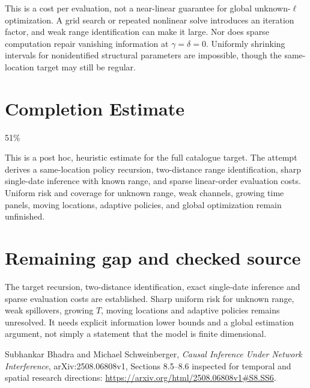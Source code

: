 \documentclass[11pt]{article}
\begin{document}
This is a cost per evaluation, not a near-linear guarantee for global unknown-$\ell$ optimization. A grid search or repeated nonlinear solve introduces an iteration factor, and weak range identification can make it large. Nor does sparse computation repair vanishing information at $\gamma=\delta=0$. Uniformly shrinking intervals for nonidentified structural parameters are impossible, though the same-location target may still be regular.

\section{Completion Estimate}
51\%

This is a post hoc, heuristic estimate for the full catalogue target.
The attempt derives a same-location policy recursion, two-distance range identification, sharp single-date inference with known range, and sparse linear-order evaluation costs. Uniform risk and coverage for unknown range, weak channels, growing time panels, moving locations, adaptive policies, and global optimization remain unfinished.

\section{Remaining gap and checked source}
The target recursion, two-distance identification, exact single-date inference and sparse evaluation costs are established. Sharp uniform risk for unknown range, weak spillovers, growing $T$, moving locations and adaptive policies remains unresolved. It needs explicit information lower bounds and a global estimation argument, not simply a statement that the model is finite dimensional.

Subhankar Bhadra and Michael Schweinberger, \emph{Causal Inference Under Network Interference}, arXiv:2508.06808v1, Sections 8.5--8.6 inspected for temporal and spatial research directions:
\url{https://arxiv.org/html/2508.06808v1#S8.SS6}.
\end{document}
